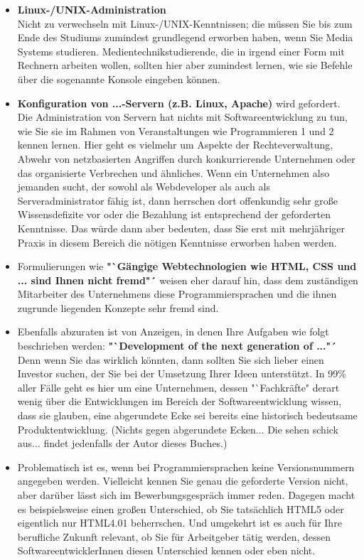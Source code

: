 \begin{itemize}
	\item \textbf{Linux-/UNIX-Administration}\\
	Nicht zu verwechseln mit Linux-/UNIX-Kenntnissen; die müssen Sie bis zum Ende des Studiums zumindest grundlegend erworben haben, wenn Sie Media Systems studieren. Medientechnikstudierende, die in irgend einer Form mit Rechnern arbeiten wollen, sollten hier aber zumindest lernen, wie sie Befehle über die sogenannte Konsole eingeben können.

	\item \textbf{Konfiguration von ...-Servern (z.B. Linux, Apache)} wird gefordert.\\
	Die Administration von Servern hat nichts mit Softwareentwicklung zu tun, wie Sie sie im Rahmen von Veranstaltungen wie Programmieren 1 und 2 kennen lernen. Hier geht es vielmehr um Aspekte der Rechteverwaltung, Abwehr von netzbasierten Angriffen durch konkurrierende Unternehmen oder das organisierte Verbrechen und ähnliches. Wenn ein Unternehmen also jemanden sucht, der sowohl als Webdeveloper als auch als Serveradministrator fähig ist, dann herrschen dort offenkundig sehr große Wissensdefizite vor oder die Bezahlung ist entsprechend der geforderten Kenntnisse. Das würde dann aber bedeuten, dass Sie erst mit mehrjähriger Praxis in diesem Bereich die nötigen Kenntnisse erworben haben werden.

	\item Formulierungen wie \textbf{"`Gängige Webtechnologien wie HTML, CSS und ... sind Ihnen nicht fremd"´} weisen eher darauf hin, dass dem zuständigen Mitarbeiter des Unternehmens diese Programmiersprachen und die ihnen zugrunde liegenden Konzepte sehr fremd sind.

	\item Ebenfalls abzuraten ist von Anzeigen, in denen Ihre Aufgaben wie folgt beschrieben werden: \textbf{"`Development of the next generation of ..."´} Denn wenn Sie das wirklich könnten, dann sollten Sie sich lieber einen Investor suchen, der Sie bei der Umsetzung Ihrer Ideen unterstützt. In 99\% aller Fälle geht es hier um eine Unternehmen, dessen "`Fachkräfte" derart wenig über die Entwicklungen im Bereich der Softwareentwicklung wissen, dass sie glauben, eine abgerundete Ecke sei bereits eine historisch bedeutsame Produktentwicklung. (Nichts gegen abgerundete Ecken... Die sehen schick aus... findet jedenfalls der Autor dieses Buches.)

	\item Problematisch ist es, wenn bei Programmiersprachen keine Versionsnummern angegeben werden. Vielleicht kennen Sie genau die geforderte Version nicht, aber darüber lässt sich im Bewerbungsgespräch immer reden. Dagegen macht es beispielsweise einen großen Unterschied, ob Sie tatsächlich HTML5 oder eigentlich nur HTML4.01 beherrschen. Und umgekehrt ist es auch für Ihre berufliche Zukunft relevant, ob Sie für Arbeitgeber tätig werden, dessen SoftwareentwicklerInnen diesen Unterschied kennen oder eben nicht.


\end{itemize}
